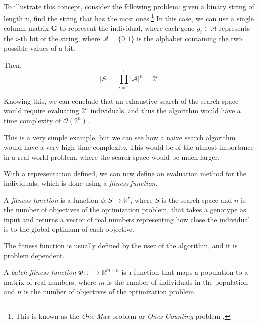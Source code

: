   To illustrate this concept, consider the following problem: given a binary string of length
  \(n\), find the string that has the most ones.\footnote{
    This is known as the \emph{One Max} problem \autocite{OneMaxProblema} or \emph{Ones Counting}
    problem \autocite{wilhelmstotterJeneticsJavaGenetica}.
  }
  In this case, we can use a single column matrix \(\mathbf{G}\) to represent the individual, 
  where each gene \(g_i \in \mathcal{A}\) represents the \(i\)-th bit of the string, where 
  \(\mathcal{A} = \{0, 1\}\) is the alphabet containing the two possible values of a bit.
  
  Then,
  \[
    |S| = \prod_{i=1}^1 |\mathcal{A}|^n = 2^n
  \]

  Knowing this, we can conclude that an exhaustive search of the search space would require 
  evaluating \(2^n\) individuals, and thus the algorithm would have a time complexity of 
  \(\mathcal{O}(2^n)\).
  
  This is a very simple example, but we can see how a naive search algorithm would have a very
  high time complexity.
  This would be of the utmost importance in a real world problem, where the search space would be
  much larger.

  With a representation defined, we can now define an evaluation method for the individuals, which
  is done using a \emph{fitness function}.

  \begin{Definition}
  \label{def:fitness_function}
    A \emph{fitness function} is a function \(\phi: S \rightarrow \mathbb{R}^n\), where \(S\) is the
    search space and \(n\) is the number of objectives of the optimization problem, that takes a
    genotype as input and returns a vector of real numbers representing how close the individual 
    is to the global optimum of each objective.

    The fitness function is usually defined by the user of the algorithm, and it is problem
    dependent.
  \end{Definition}

  \begin{Definition}
  \label{def:batch_fitness_function}
    A \emph{batch fitness function} \(\Phi: \mathbb{P} \rightarrow \mathbb{R}^{m \times n}\) is a 
    function that maps a population to a matrix of real numbers, where \(m\) is the number of
    individuals in the population and \(n\) is the number of objectives of the optimization
    problem.
  \end{Definition}

